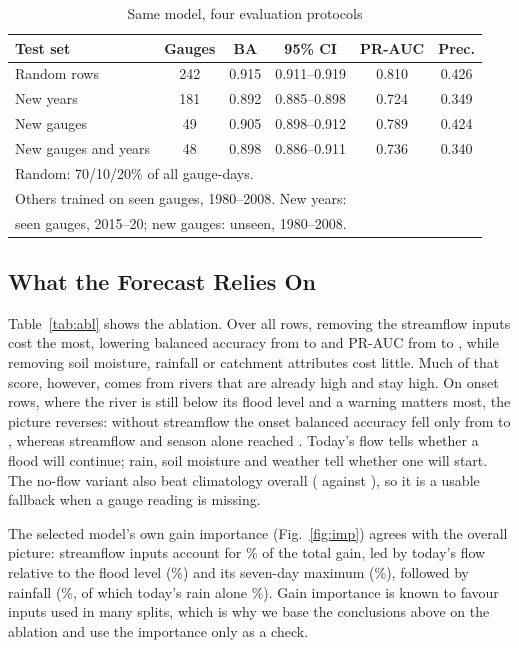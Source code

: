 \documentclass[conference]{IEEEtran}
\begin{document}
\begin{table}[t]
\caption{Same model, four evaluation protocols}
\label{tab:leak}
\centering
\footnotesize
\setlength{\tabcolsep}{2.4pt}
\begin{tabular}{lccccc}
\toprule
Test set & Gauges & BA & 95\% CI & PR-AUC & Prec.\\
\midrule
Random rows & 242 & 0.915 & 0.911--0.919 & 0.810 & 0.426\\
New years & 181 & 0.892 & 0.885--0.898 & 0.724 & 0.349\\
New gauges & 49 & 0.905 & 0.898--0.912 & 0.789 & 0.424\\
New gauges and years & 48 & 0.898 & 0.886--0.911 & 0.736 & 0.340\\
\bottomrule
\multicolumn{6}{l}{\scriptsize Random: 70/10/20\% of all gauge-days.}\\
\multicolumn{6}{l}{\scriptsize Others trained on seen gauges, 1980--2008. New years:}\\
\multicolumn{6}{l}{\scriptsize seen gauges, 2015--20; new gauges: unseen, 1980--2008.}\\
\end{tabular}
\end{table}

\subsection{What the Forecast Relies On}
Table~\ref{tab:abl} shows the ablation. Over all rows, removing the streamflow inputs cost the most, lowering balanced accuracy from \AblAllBA{} to \NoFlowBA{} and PR-AUC from \AblAllPR{} to \NoFlowPR, while removing soil moisture, rainfall or catchment attributes cost little. Much of that score, however, comes from rivers that are already high and stay high. On onset rows, where the river is still below its flood level and a warning matters most, the picture reverses: without streamflow the onset balanced accuracy fell only from \OnsetAll{} to \OnsetNoFlow, whereas streamflow and season alone reached \OnsetFlowOnly. Today's flow tells whether a flood will continue; rain, soil moisture and weather tell whether one will start. The no-flow variant also beat climatology overall (\NoFlowBA{} against \ClimBA), so it is a usable fallback when a gauge reading is missing.

The selected model's own gain importance (Fig.~\ref{fig:imp}) agrees with the overall picture: streamflow inputs account for \ImpFlow\% of the total gain, led by today's flow relative to the flood level (\ImpTopOne\%) and its seven-day maximum (\ImpTopTwo\%), followed by rainfall (\ImpRain\%, of which today's rain alone \ImpRainDay\%). Gain importance is known to favour inputs used in many splits, which is why we base the conclusions above on the ablation and use the importance only as a check.
\end{document}
